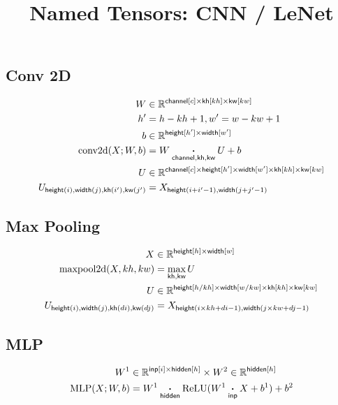 \documentclass{article}
\title{Named Tensors: CNN / LeNet}
\date{}
\newcommand{\reals}[0]{\mathbb{R}}
\begin{document}
\maketitle


\subsection*{Conv 2D}

\begin{align*} 
W &\in \reals^{\nset{channel}{c} \times\nset{kh}{kh} \times \nset{kw}{kw}} \\
h' &= h-kh +1, w' = w-kw +1 \\
b &\in \reals^{\nset{height}{h'} \times \nset{width}{w'}}  \\
\text{conv2d}(X; W, b) &=  W \ndot{channel, kh, kw} U + b \\
U &\in \reals^{{\nset{channel}{c} \times \nset{height}{h'} \times
\nset{width}{w'} \times \nset{kh}{kh} \times \nset{kw}{kw}}}  \\
U_{\nidx{height}{i}, \nidx{width}{j}, \nidx{kh}{i'}, \nidx{kw}{j'}} &= X_{\nidx{height}{i+i' - 1}, \nidx{width}{j+j' - 1}}  
\end{align*}

\subsection*{Max Pooling}

\begin{align*} 
X &\in \reals^{\nset{height}{h} \times \nset{width}{w}} \\
\text{maxpool2d}(X, kh, kw) &=  \nfun{kh, kw}{max}  U \\
U &\in \reals^{{\nset{height}{h / kh} \times
\nset{width}{w / kw} \times \nset{kh}{kh} \times \nset{kw}{kw}}}  \\
U_{\nidx{height}{i}, \nidx{width}{j}, \nidx{kh}{di}, \nidx{kw}{dj}} & = X_{\nidx{height}{i \times kh + di -1}, \nidx{width}{j \times kw + dj - 1}}  
\end{align*}

\subsection*{MLP}

\begin{align*} 
W^1 &\in \reals^{\nset{inp}{i} \times \nset{hidden}{h}} \times 
W^2 \in \reals^{ \nset{hidden}{h}} \\
\text{MLP}(X; W, b) &=  W^1 \ndot{hidden} \text{ReLU}(W^1 \ndot{inp} X + b^1) + b^2 
\end{align*}
\end{document}
